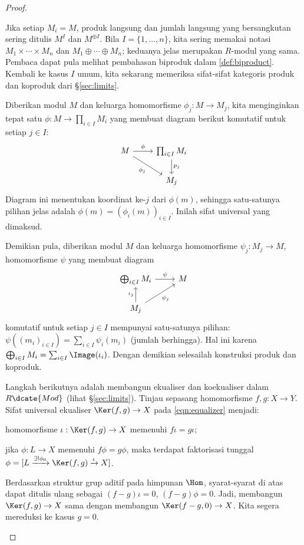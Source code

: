 \begin{proof}
\begin{asparaenum}
		Jika setiap $M_i = M$, produk langsung dan jumlah langsung yang bersangkutan sering ditulis $M^I$ dan $M^{\oplus I}$. Bila $I=\{1, \ldots, n\}$, kita sering memakai notasi $M_1 \times \cdots \times M_n$ dan $M_1 \oplus \cdots \oplus M_n$; keduanya jelas merupakan $R$-modul yang sama. Pembaca dapat pula melihat pembahasan biproduk dalam \ref{def:biproduct}. Kembali ke kasus $I$ umum, kita sekarang memeriksa sifat-sifat kategoris produk dan koproduk dari \S\ref{sec:limits}.

		Diberikan modul $M$ dan keluarga homomorfisme $\phi_j: M \to M_j$, kita menginginkan tepat satu $\phi: M \to \prod_{i \in I} M_i$ yang membuat diagram berikut komutatif untuk setiap $j \in I$:
		\[ \begin{tikzcd}
			M \arrow[rd, "\phi_j"'] \arrow[r, "\phi"] & \prod_{i \in I} M_i \arrow[d, "p_j"] \\
			& M_j
		\end{tikzcd} \]
		Diagram ini menentukan koordinat ke-$j$ dari $\phi(m)$, sehingga satu-satunya pilihan jelas adalah $\phi(m) = (\phi_i(m))_{i \in I}$. Inilah sifat universal yang dimaksud.

		Demikian pula, diberikan modul $M$ dan keluarga homomorfisme $\psi_j: M_j \to M$, homomorfisme $\psi$ yang membuat diagram
		\[ \begin{tikzcd}
			\bigoplus_{i \in I} M_i \arrow[r, "\psi"] & M \\
			M_j \arrow[u, "\iota_j"] \arrow[ru, "\psi_j"'] &
		\end{tikzcd} \]
		komutatif untuk setiap $j \in I$ mempunyai satu-satunya pilihan: $\psi((m_i)_{i \in I}) = \sum_{i \in I} \psi_i(m_i)$ (jumlah berhingga). Hal ini karena $\bigoplus_{i \in I} M_i = \sum_{i \in I} \Image(\iota_i)$. Dengan demikian selesailah konstruksi produk dan koproduk.

		\item Langkah berikutnya adalah membangun ekualiser dan koekualiser dalam $R\dcate{Mod}$ (lihat \S\ref{sec:limits}). Tinjau sepasang homomorfisme $f, g: X \to Y$. Sifat universal ekualiser $\Ker(f,g) \to X$ pada \eqref{eqn:equalizer} menjadi:
	    \begin{compactitem}
			\item homomorfisme $\iota: \Ker(f,g) \to X$ memenuhi $f\iota = g\iota$;
			\item jika $\phi: L \to X$ memenuhi $f\phi = g\phi$, maka terdapat faktorisasi tunggal $\phi = [L \xrightarrow{\exists! \phi_0} \Ker(f,g) \xrightarrow{\iota} X]$.
		\end{compactitem}
		Berdasarkan struktur grup aditif pada himpunan $\Hom$, syarat-syarat di atas dapat ditulis ulang sebagai $(f-g)\iota = 0$, $(f-g)\phi = 0$. Jadi, membangun $\Ker(f,g) \to X$ sama dengan membangun $\Ker(f-g, 0) \to X$. Kita segera mereduksi ke kasus $g=0$.


\end{asparaenum}
\end{proof}
